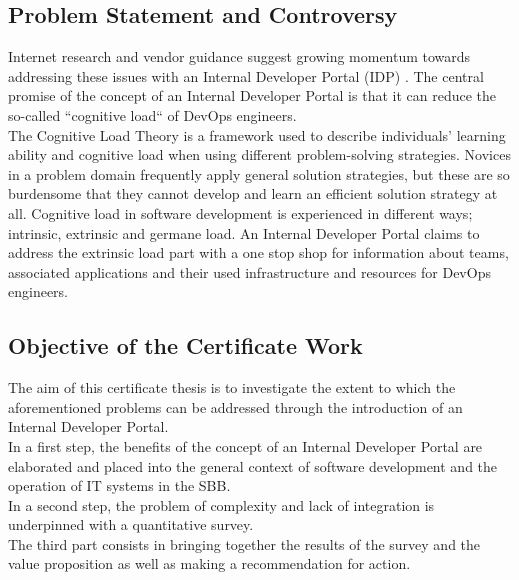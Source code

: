 \documentclass[a4paper,10pt]{article}
\begin{document}
    \subsection{Problem Statement and Controversy}
    \label{subsec:iproblemstatement}
    Internet research and vendor guidance suggest growing momentum towards addressing these issues with an Internal
    Developer Portal (IDP) .
    The central promise of the concept of an Internal Developer Portal is that it can reduce the so-called ``cognitive load``
    of DevOps engineers.\\
    The Cognitive Load Theory is a framework used to describe individuals' learning ability and cognitive load when using
    different problem-solving strategies.
    Novices in a problem domain frequently apply general solution strategies, but these are so burdensome that they
    cannot develop and learn an efficient solution strategy at all\parencite{cogload}.
    Cognitive load in software development is experienced in different ways; intrinsic, extrinsic and germane load\parencite{cogdev}.
    An Internal Developer Portal claims to address the extrinsic load part with a one stop shop for information about teams,
    associated applications and their used infrastructure and resources for DevOps engineers.

    \subsection{Objective of the Certificate Work}
    \label{subsec:iobjective}
    The aim of this certificate thesis is to investigate the extent to which the aforementioned problems can be addressed
    through the introduction of an Internal Developer Portal.\\
    In a first step, the benefits of the concept of an Internal Developer Portal are elaborated and placed
    into the general context of software development and the operation of IT systems in the SBB.\\
    In a second step, the problem of complexity and lack of integration is underpinned with a quantitative survey.\\
    The third part consists in bringing together the results of the survey and the value proposition as well as making a
    recommendation for action.
\end{document}
